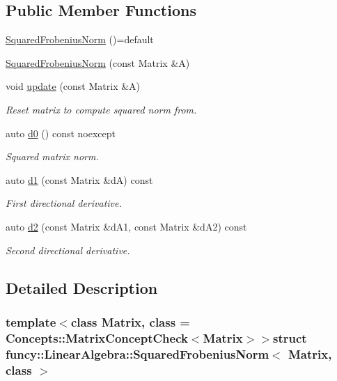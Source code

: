 \subsection*{Public Member Functions}
\begin{DoxyCompactItemize}
\item 
\hyperlink{structfuncy_1_1LinearAlgebra_1_1SquaredFrobeniusNorm_a943d1a15ed1b89f78a7fabc5759f0e64}{Squared\-Frobenius\-Norm} ()=default
\item 
\hyperlink{structfuncy_1_1LinearAlgebra_1_1SquaredFrobeniusNorm_af70ae5da4995f8c42ab69557f588ea89}{Squared\-Frobenius\-Norm} (const Matrix \&A)
\item 
void \hyperlink{structfuncy_1_1LinearAlgebra_1_1SquaredFrobeniusNorm_ae8a0e68f269934f62be66b5334e955f3}{update} (const Matrix \&A)
\begin{DoxyCompactList}\small\item\em Reset matrix to compute squared norm from. \end{DoxyCompactList}\item 
auto \hyperlink{structfuncy_1_1LinearAlgebra_1_1SquaredFrobeniusNorm_a1e8286f643839e086ae464da6fcbc950}{d0} () const noexcept
\begin{DoxyCompactList}\small\item\em Squared matrix norm. \end{DoxyCompactList}\item 
auto \hyperlink{structfuncy_1_1LinearAlgebra_1_1SquaredFrobeniusNorm_a7d33eadc4f99eb257e05df22f232532a}{d1} (const Matrix \&d\-A) const 
\begin{DoxyCompactList}\small\item\em First directional derivative. \end{DoxyCompactList}\item 
auto \hyperlink{structfuncy_1_1LinearAlgebra_1_1SquaredFrobeniusNorm_a52c955eb450c5755ae9d4a2d33ba5761}{d2} (const Matrix \&d\-A1, const Matrix \&d\-A2) const 
\begin{DoxyCompactList}\small\item\em Second directional derivative. \end{DoxyCompactList}\end{DoxyCompactItemize}


\subsection{Detailed Description}
\subsubsection*{template$<$class Matrix, class = Concepts\-::\-Matrix\-Concept\-Check$<$\-Matrix$>$$>$struct funcy\-::\-Linear\-Algebra\-::\-Squared\-Frobenius\-Norm$<$ Matrix, class $>$}

